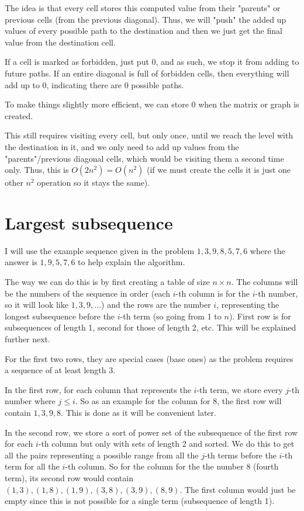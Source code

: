 \documentclass[11pt,letterpaper]{article}
\begin{document}
		The idea is that every cell stores this computed value from their "parents" or previous cells (from the previous diagonal).
		Thus, we will "push" the added up values of every possible path to the destination and then we just get the final value from the destination cell.
		
		If a cell is marked as forbidden, just put 0, and as such, we stop it from adding to future paths. If an entire diagonal is full of forbidden cells, then everything will add up to 0, indicating there are 0 possible paths.
		
		To make things slightly more efficient, we can store 0 when the matrix or graph is created.
		
		This still requires visiting every cell, but only once, until we reach the level with the destination in it, and we only need to add up values from the "parents"/previous diagonal cells, which would be visiting them a second time only. Thus, this is $O(2n^2)=O(n^2)$ (if we must create the cells it is just one other $n^2$ operation so it stays the same).
	
	\section{Largest subsequence}
		I will use the example sequence given in the problem $1, 3, 9, 8, 5, 7, 6$ where the answer is $1, 9, 5, 7, 6$ to help explain the algorithm.
		
		The way we can do this is by first creating a table of size $n \times n$.
		The columns will be the numbers of the sequence in order (each $i$-th column is for the $i$-th number, so it will look like $1, 3, 9, ...$) and the rows are the number $i$, representing the longest subsequence before the $i$-th term (so going from 1 to $n$).
		First row is for subsequences of length 1, second for those of length 2, etc.
		This will be explained further next.
		
		For the first two rows, they are special cases (base ones) as the problem requires a sequence of at least length 3.
		
		In the first row, for each column that represents the $i$-th term, we store every $j$-th number where $j \le i$.
		So as an example for the column for 8, the first row will contain $1,3,9,8$.
		This is done as it will be convenient later.
		
		In the second row, we store a sort of power set of the subsequence of the first row for each $i$-th column but only with sets of length 2 and sorted.
		We do this to get all the pairs representing a possible range from all the $j$-th terms before the $i$-th term for all the $i$-th column.
		So for the column for the the number 8 (fourth term), its second row would contain $(1,3), (1,8), (1,9), (3,8), (3,9), (8,9)$.
		The first column would just be empty since this is not possible for a single term (subsequence of length 1).
		
\end{document}
